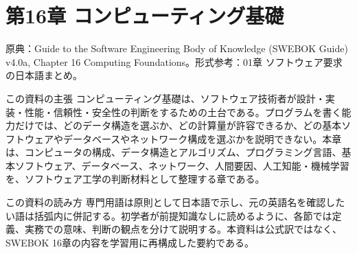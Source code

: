 \section{第16章 コンピューティング基礎}
原典：Guide to the Software Engineering Body of Knowledge (SWEBOK Guide) v4.0a, Chapter 16 Computing Foundations。形式参考：01章 ソフトウェア要求の日本語まとめ。

\begin{pointbox}{この資料の主張}
コンピューティング基礎は、ソフトウェア技術者が設計・実装・性能・信頼性・安全性の判断をするための土台である。プログラムを書く能力だけでは、どのデータ構造を選ぶか、どの計算量が許容できるか、どの基本ソフトウェアやデータベースやネットワーク構成を選ぶかを説明できない。本章は、コンピュータの構成、データ構造とアルゴリズム、プログラミング言語、基本ソフトウェア、データベース、ネットワーク、人間要因、人工知能・機械学習を、ソフトウェア工学の判断材料として整理する章である。

\end{pointbox}

\begin{pointbox}{この資料の読み方}
専門用語は原則として日本語で示し、元の英語名を確認したい語は括弧内に併記する。初学者が前提知識なしに読めるように、各節では定義、実務での意味、判断の観点を分けて説明する。本資料は公式訳ではなく、SWEBOK 16章の内容を学習用に再構成した要約である。

\end{pointbox}
